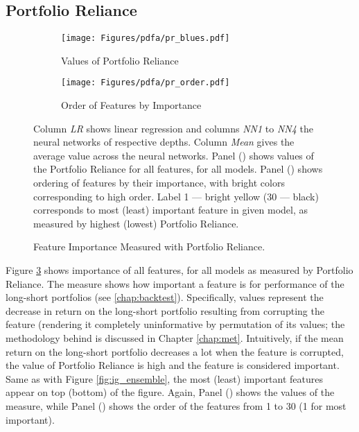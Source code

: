 	
	\subsection{Portfolio Reliance}
	
		\begin{figure}	
			\centering		
			\begin{subfigure}[t]{\textwidth}
				\texttt{[image: Figures/pdfa/pr\_blues.pdf]}
				\caption{Values of Portfolio Reliance}
				\label{fig:pr_blues}
			\end{subfigure}
			
			\begin{subfigure}[t]{\textwidth}
				\centering
				\texttt{[image: Figures/pdfa/pr\_order.pdf]}
				\caption{Order of Features by Importance}
				\label{fig:pr_order}
			\end{subfigure}
			\caption{Feature Importance Measured with Portfolio Reliance.}
			\medskip
			\small
			Column \textit{LR} shows linear regression and columns \textit{NN1} to \textit{NN4} the neural networks of respective depths. Column \textit{Mean} gives the average value across the neural networks. Panel () shows values of the Portfolio Reliance for all features, for all models.  Panel () shows ordering of features by their importance, with bright colors corresponding to high order. Label 1 --- bright yellow (30 --- black) corresponds to most (least) important feature in given model, as measured by highest (lowest) Portfolio Reliance. 
			\label{fig:pr_ensemble}
		\end{figure}
		
		Figure \ref{fig:pr_ensemble} shows importance of all features, for all models as measured by Portfolio Reliance. The measure shows how important a feature is for performance of the long-short portfolios (see \ref{chap:backtest}). Specifically, values represent the decrease in return on the long-short portfolio resulting from corrupting the feature (rendering it completely uninformative by permutation of its values; the methodology behind is discussed in Chapter \ref{chap:met}. Intuitively, if the mean return on the long-short portfolio decreases a lot when the feature is corrupted, the value of Portfolio Reliance is high and the feature is considered important. Same as with Figure \ref{fig:ig_ensemble}, the most (least) important features appear on top (bottom) of the figure. Again, Panel () shows the values of the measure, while Panel () shows the order of the features from 1 to 30 (1 for most important). 
			
